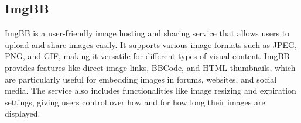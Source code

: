 \subsection{ImgBB}

ImgBB is a user-friendly image hosting and sharing service that allows users to upload and share images easily. It supports various image formats such as JPEG, PNG, and GIF, making it versatile for different types of visual content. ImgBB provides features like direct image links, BBCode, and HTML thumbnails, which are particularly useful for embedding images in forums, websites, and social media. The service also includes functionalities like image resizing and expiration settings, giving users control over how and for how long their images are displayed.

